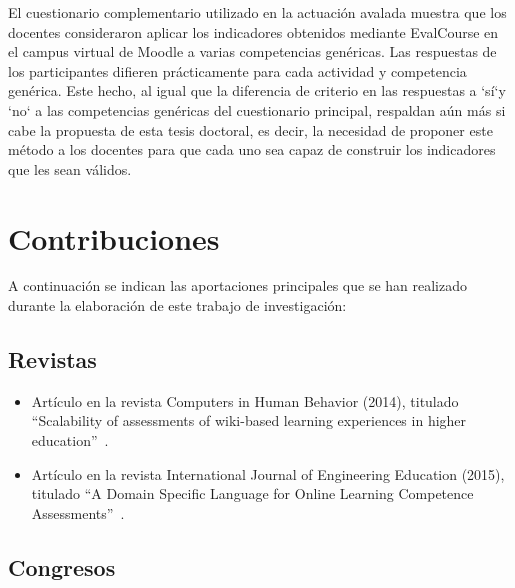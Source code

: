 El cuestionario complementario utilizado en la actuación avalada muestra que los docentes consideraron aplicar los indicadores obtenidos mediante EvalCourse en el campus virtual de Moodle a varias competencias genéricas. Las respuestas de los participantes difieren prácticamente para cada actividad y competencia genérica. Este hecho, al igual que la diferencia de criterio en las respuestas a `sí`y `no` a las competencias genéricas del cuestionario principal, respaldan aún más si cabe la propuesta de esta tesis doctoral, es decir, la necesidad de proponer este método a los docentes para que cada uno sea capaz de construir los indicadores que les sean válidos.

\section{Contribuciones} \label{eva:contribuciones}

	A continuación se indican las aportaciones principales que se han realizado durante la elaboración de este trabajo de investigación:

	\subsection*{Revistas}

	\begin{itemize}
	\item Artículo en la revista Computers in Human Behavior (2014), titulado ``Scalability of assessments of wiki-based learning experiences in higher education''~\cite{palomo2014scalability}.
	\item Artículo en la revista International Journal of Engineering Education (2015), titulado ``A Domain Specific Language for Online Learning Competence Assessments''~\cite{Balderas:2015}.
	\end{itemize}

	\subsection*{Congresos}

